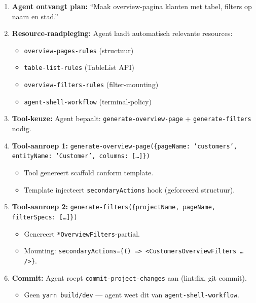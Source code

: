 \begin{enumerate}
  \item \textbf{Agent ontvangt plan:} ``Maak overview-pagina klanten met tabel, filters op naam en stad.''
  
  \item \textbf{Resource-raadpleging:} Agent laadt automatisch relevante resources:
    \begin{itemize}
      \item \texttt{overview-pages-rules} (structuur)
      \item \texttt{table-list-rules} (TableList API)
      \item \texttt{overview-filters-rules} (filter-mounting)
      \item \texttt{agent-shell-workflow} (terminal-policy)
    \end{itemize}
  
  \item \textbf{Tool-keuze:} Agent bepaalt: \texttt{generate-overview-page} + \texttt{generate-filters} nodig.
  
  \item \textbf{Tool-aanroep 1:} \texttt{generate-overview-page(\{pageName: 'customers', entityName: 'Customer', columns: […]\})}
    \begin{itemize}
      \item Tool genereert scaffold conform template.
      \item Template injecteert \texttt{secondaryActions} hook (geforceerd structuur).
    \end{itemize}
  
  \item \textbf{Tool-aanroep 2:} \texttt{generate-filters(\{projectName, pageName, filterSpecs: […]\})}
    \begin{itemize}
      \item Genereert \texttt{*OverviewFilters}-partial.
      \item Mounting: \texttt{secondaryActions=\{() => <CustomersOverviewFilters … />\}}.
    \end{itemize}
  
  \item \textbf{Commit:} Agent roept \texttt{commit-project-changes} aan (lint:fix, git commit).
    \begin{itemize}
      \item Geen \texttt{yarn build/dev} — agent weet dit van \texttt{agent-shell-workflow}.
    \end{itemize}
\end{enumerate}

